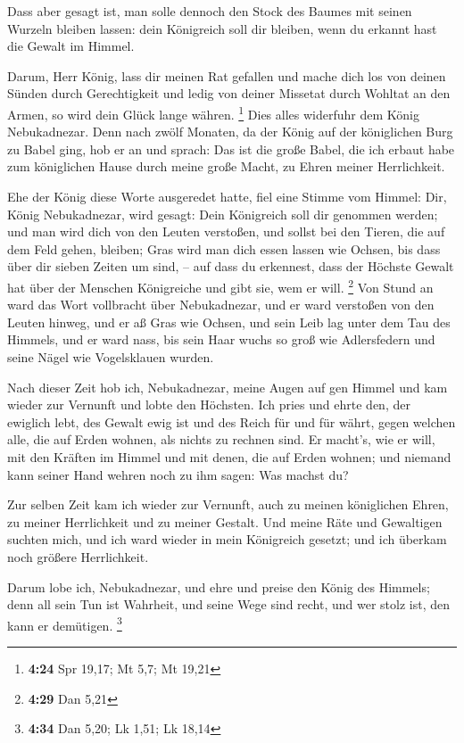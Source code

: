  Dass aber gesagt ist, man solle dennoch den Stock des
Baumes mit seinen Wurzeln bleiben lassen: dein Königreich soll dir
bleiben, wenn du erkannt hast die Gewalt im Himmel.

 Darum, Herr König, lass dir meinen Rat gefallen und mache
dich los von deinen Sünden durch Gerechtigkeit und ledig von deiner
Missetat durch Wohltat an den Armen, so wird dein Glück lange währen.
\footnote{\textbf{4:24} Spr 19,17; Mt 5,7; Mt 19,21}  Dies
alles widerfuhr dem König Nebukadnezar.  Denn nach zwölf
Monaten, da der König auf der königlichen Burg zu Babel ging,
 hob er an und sprach: Das ist die große Babel, die ich
erbaut habe zum königlichen Hause durch meine große Macht, zu Ehren
meiner Herrlichkeit.

 Ehe der König diese Worte ausgeredet hatte, fiel eine
Stimme vom Himmel: Dir, König Nebukadnezar, wird gesagt: Dein Königreich
soll dir genommen werden;  und man wird dich von den Leuten
verstoßen, und sollst bei den Tieren, die auf dem Feld gehen, bleiben;
Gras wird man dich essen lassen wie Ochsen, bis dass über dir sieben
Zeiten um sind, -- auf dass du erkennest, dass der Höchste Gewalt hat
über der Menschen Königreiche und gibt sie, wem er will. \footnote{\textbf{4:29}
  Dan 5,21}  Von Stund an ward das Wort vollbracht über
Nebukadnezar, und er ward verstoßen von den Leuten hinweg, und er aß
Gras wie Ochsen, und sein Leib lag unter dem Tau des Himmels, und er
ward nass, bis sein Haar wuchs so groß wie Adlersfedern und seine Nägel
wie Vogelsklauen wurden.

 Nach dieser Zeit hob ich, Nebukadnezar, meine Augen auf
gen Himmel und kam wieder zur Vernunft und lobte den Höchsten. Ich pries
und ehrte den, der ewiglich lebt, des Gewalt ewig ist und des Reich für
und für währt,  gegen welchen alle, die auf Erden wohnen,
als nichts zu rechnen sind. Er macht's, wie er will, mit den Kräften im
Himmel und mit denen, die auf Erden wohnen; und niemand kann seiner Hand
wehren noch zu ihm sagen: Was machst du?

 Zur selben Zeit kam ich wieder zur Vernunft, auch zu
meinen königlichen Ehren, zu meiner Herrlichkeit und zu meiner Gestalt.
Und meine Räte und Gewaltigen suchten mich, und ich ward wieder in mein
Königreich gesetzt; und ich überkam noch größere Herrlichkeit.

 Darum lobe ich, Nebukadnezar, und ehre und preise den
König des Himmels; denn all sein Tun ist Wahrheit, und seine Wege sind
recht, und wer stolz ist, den kann er demütigen. \footnote{\textbf{4:34}
  Dan 5,20; Lk 1,51; Lk 18,14}

